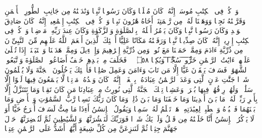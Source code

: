 \startbuffer[\q:19:51]
وَٱذۡكُرۡ فِی ٱلۡكِتَٰبِ مُوسَىٰۤۚ إِنَّهُۥ كَانَ مُخۡلَصࣰا وَكَانَ رَسُولࣰا نَّبِیࣰّا%
\stopbuffer%
\startbuffer[\q:19:52]
وَنَٰدَیۡنَٰهُ مِن جَانِبِ ٱلطُّورِ ٱلۡأَیۡمَنِ وَقَرَّبۡنَٰهُ نَجِیࣰّا%
\stopbuffer%
\startbuffer[\q:19:53]
وَوَهَبۡنَا لَهُۥ مِن رَّحۡمَتِنَاۤ أَخَاهُ هَٰرُونَ نَبِیࣰّا%
\stopbuffer%
\startbuffer[\q:19:54]
وَٱذۡكُرۡ فِی ٱلۡكِتَٰبِ إِسۡمَٰعِیلَۚ إِنَّهُۥ كَانَ صَادِقَ ٱلۡوَعۡدِ وَكَانَ رَسُولࣰا نَّبِیࣰّا%
\stopbuffer%
\startbuffer[\q:19:55]
وَكَانَ یَأۡمُرُ أَهۡلَهُۥ بِٱلصَّلَوٰةِ وَٱلزَّكَوٰةِ وَكَانَ عِندَ رَبِّهِۦ مَرۡضِیࣰّا%
\stopbuffer%
\startbuffer[\q:19:56]
وَٱذۡكُرۡ فِی ٱلۡكِتَٰبِ إِدۡرِیسَۚ إِنَّهُۥ كَانَ صِدِّیقࣰا نَّبِیࣰّا%
\stopbuffer%
\startbuffer[\q:19:57]
وَرَفَعۡنَٰهُ مَكَانًا عَلِیًّا%
\stopbuffer%
\startbuffer[\q:19:58]
أُو۟لَٰۤئِكَ ٱلَّذِینَ أَنۡعَمَ ٱللَّهُ عَلَیۡهِم مِّنَ ٱلنَّبِیِّۦنَ مِن ذُرِّیَّةِ ءَادَمَ وَمِمَّنۡ حَمَلۡنَا مَعَ نُوحࣲ وَمِن ذُرِّیَّةِ إِبۡرَٰهِیمَ وَإِسۡرَٰۤءِیلَ وَمِمَّنۡ هَدَیۡنَا وَٱجۡتَبَیۡنَاۤۚ إِذَا تُتۡلَىٰ عَلَیۡهِمۡ ءَایَٰتُ ٱلرَّحۡمَٰنِ خَ̅رُّ̅و̅ا۟̅ ̅سُ̅جَّ̅دࣰ̅ا̅ وَبُكِیࣰّا ۝٥٨ ۩%
\stopbuffer%
\startbuffer[\q:19:59]
۞ فَخَلَفَ مِنۢ بَعۡدِهِمۡ خَلۡفٌ أَضَاعُوا۟ ٱلصَّلَوٰةَ وَٱتَّبَعُوا۟ ٱلشَّهَوَٰتِۖ فَسَوۡفَ یَلۡقَوۡنَ غَیًّا%
\stopbuffer%
\startbuffer[\q:19:60]
إِلَّا مَن تَابَ وَءَامَنَ وَعَمِلَ صَٰلِحࣰا فَأُو۟لَٰۤئِكَ یَدۡخُلُونَ ٱلۡجَنَّةَ وَلَا یُظۡلَمُونَ شَیۡءࣰا%
\stopbuffer%
\startbuffer[\q:19:61]
جَنَّٰتِ عَدۡنٍ ٱلَّتِی وَعَدَ ٱلرَّحۡمَٰنُ عِبَادَهُۥ بِٱلۡغَیۡبِۚ إِنَّهُۥ كَانَ وَعۡدُهُۥ مَأۡتِیࣰّا%
\stopbuffer%
\startbuffer[\q:19:62]
لَّا یَسۡمَعُونَ فِیهَا لَغۡوًا إِلَّا سَلَٰمࣰاۖ وَلَهُمۡ رِزۡقُهُمۡ فِیهَا بُكۡرَةࣰ وَعَشِیࣰّا%
\stopbuffer%
\startbuffer[\q:19:63]
تِلۡكَ ٱلۡجَنَّةُ ٱلَّتِی نُورِثُ مِنۡ عِبَادِنَا مَن كَانَ تَقِیࣰّا%
\stopbuffer%
\startbuffer[\q:19:64]
وَمَا نَتَنَزَّلُ إِلَّا بِأَمۡرِ رَبِّكَۖ لَهُۥ مَا بَیۡنَ أَیۡدِینَا وَمَا خَلۡفَنَا وَمَا بَیۡنَ ذَٰلِكَۚ وَمَا كَانَ رَبُّكَ نَسِیࣰّا%
\stopbuffer%
\startbuffer[\q:19:65]
رَّبُّ ٱلسَّمَٰوَٰتِ وَٱلۡأَرۡضِ وَمَا بَیۡنَهُمَا فَٱعۡبُدۡهُ وَٱصۡطَبِرۡ لِعِبَٰدَتِهِۦۚ هَلۡ تَعۡلَمُ لَهُۥ سَمِیࣰّا%
\stopbuffer%
\startbuffer[\q:19:66]
وَیَقُولُ ٱلۡإِنسَٰنُ أَءِذَا مَا مِتُّ لَسَوۡفَ أُخۡرَجُ حَیًّا%
\stopbuffer%
\startbuffer[\q:19:67]
أَوَ لَا یَذۡكُرُ ٱلۡإِنسَٰنُ أَنَّا خَلَقۡنَٰهُ مِن قَبۡلُ وَلَمۡ یَكُ شَیۡءࣰا%
\stopbuffer%
\startbuffer[\q:19:68]
فَوَرَبِّكَ لَنَحۡشُرَنَّهُمۡ وَٱلشَّیَٰطِینَ ثُمَّ لَنُحۡضِرَنَّهُمۡ حَوۡلَ جَهَنَّمَ جِثِیࣰّا%
\stopbuffer%
\startbuffer[\q:19:69]
ثُمَّ لَنَنزِعَنَّ مِن كُلِّ شِیعَةٍ أَیُّهُمۡ أَشَدُّ عَلَى ٱلرَّحۡمَٰنِ عِتِیࣰّا%
\stopbuffer%
\startbuffer[\q:19:70]
